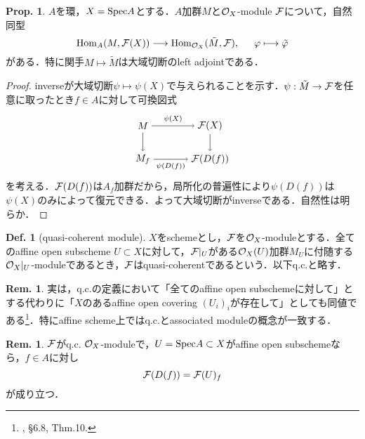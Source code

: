 \documentclass[dvipdfmx,b5paper,papersize]{jsarticle}
\theoremstyle{definition}
\newtheorem{prop}[thm]{Prop.}
\newtheorem{defi}[thm]{Def.}
\newtheorem{rem}[thm]{Rem.}
\begin{document}
\begin{prop}
  $A$を環，$X={\rm Spec}A$とする．$A$加群$M$と${\cal{O}}_X$-module $\cal{F}$について，自然同型
  \[
    {\rm Hom}_A(M,{\cal{F}}(X)) \longrightarrow {\rm Hom}_{{\cal{O}}_X}(\tilde M,\cal{F}),\hspace{15pt} \varphi \longmapsto \tilde \varphi
  \]
  がある．特に関手$M \mapsto \tilde M$は大域切断のleft adjointである．
\end{prop}

\begin{proof}
inverseが大域切断$\psi \longmapsto \psi(X)$で与えられることを示す．$\psi :\tilde M \to \cal{F}$を任意に取ったとき$f \in A$に対して可換図式
\[
  \begin{tikzpicture}[auto,->]
    \node (a) at (0,1.2) {$M$}; \node (x) at (2.4,1.2) {${\cal{F}}(X)$};
    \node (b) at (0,0) {$M_f$}; \node (y) at (2.4,0) {${\cal{F}}(D(f))$};
    \draw (a) -- node {$\scriptstyle \psi(X)$} (x);
    \draw (x) -- node {$\scriptstyle $} (y);
    \draw (a) -- node[swap] {$\scriptstyle $} (b);
    \draw (b) -- node[swap] {$\scriptstyle \psi(D(f))$} (y);
  \end{tikzpicture}
\]
を考える．${\cal{F}}(D(f))$は$A_f$加群だから，局所化の普遍性により$\psi(D(f))$は$\psi(X)$のみによって復元できる．よって大域切断がinverseである．自然性は明らか．
\end{proof}

\begin{defi}[quasi-coherent module]
  $X$をschemeとし，$\cal{F}$を${\cal{O}}_X$-moduleとする．全てのaffine open subscheme $U \subset X$に対して，${\cal{F}}|_U$がある${\cal{O}}_X(U)$加群$M_U$に付随する${\cal{O}}_X|_U$-moduleであるとき，$\cal{F}$はquasi-coherentであるという．以下q.c.と略す．


\end{defi}

\begin{rem}\label{thm:q.c.local}
  実は，q.c.の定義において「全てのaffine open subschemeに対して」とする代わりに「$X$のあるaffine open covering $(U_i)_i$が存在して」としても同値である\footnote{\cite{Bosch}, \S 6.8, Thm.10.}．特にaffine scheme上ではq.c.とassociated moduleの概念が一致する．
\end{rem}
\begin{rem}
  $\cal{F}$がq.c. ${\cal{O}}_X$-moduleで，$U={\rm Spec}A \subset X$がaffine open subschemeなら，$f \in A$に対し
  \[
    {\cal{F}}(D(f))={\cal{F}}(U)_f
  \]
  が成り立つ．

\end{rem}
\end{document}
